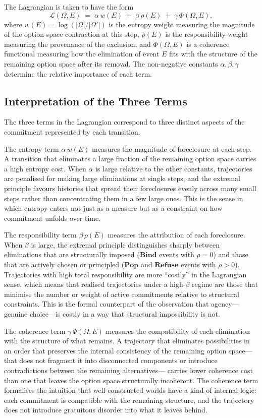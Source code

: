 \documentclass[12pt]{article}
\theoremstyle{plain}
\theoremstyle{definition}
\theoremstyle{remark}
\begin{document}
The Lagrangian is taken to have the form
\[
  \mathcal{L}(\Omega, E)
  \;=\;
  \alpha\, w(E) \;+\; \beta\, \rho(E) \;+\; \gamma\, \Phi(\Omega, E),
\]
where $w(E) = \log(|\Omega| / |\Omega'|)$ is the entropy weight measuring the
magnitude of the option-space contraction at this step, $\rho(E)$ is the
responsibility weight measuring the provenance of the exclusion, and
$\Phi(\Omega, E)$ is a coherence functional measuring how the elimination of
event $E$ fits with the structure of the remaining option space after its
removal.  The non-negative constants $\alpha, \beta, \gamma$ determine the
relative importance of each term.

\subsection{Interpretation of the Three Terms}

The three terms in the Lagrangian correspond to three distinct aspects of the
commitment represented by each transition.

The entropy term $\alpha\, w(E)$ measures the magnitude of foreclosure at each
step.  A transition that eliminates a large fraction of the remaining option
space carries a high entropy cost.  When $\alpha$ is large relative to the other
constants, trajectories are penalised for making large eliminations at single
steps, and the extremal principle favours histories that spread their foreclosures
evenly across many small steps rather than concentrating them in a few large ones.
This is the sense in which entropy enters not just as a measure but as a
constraint on how commitment unfolds over time.

The responsibility term $\beta\, \rho(E)$ measures the attribution of each
foreclosure.  When $\beta$ is large, the extremal principle distinguishes
sharply between eliminations that are structurally imposed ($\mathbf{Bind}$
events with $\rho = 0$) and those that are actively chosen or principled
($\mathbf{Pop}$ and $\mathbf{Refuse}$ events with $\rho > 0$).  Trajectories
with high total responsibility are more ``costly'' in the Lagrangian sense,
which means that realised trajectories under a high-$\beta$ regime are those
that minimise the number or weight of active commitments relative to structural
constraints.  This is the formal counterpart of the observation that agency---
genuine choice---is costly in a way that structural impossibility is not.

The coherence term $\gamma\, \Phi(\Omega, E)$ measures the compatibility of
each elimination with the structure of what remains.  A trajectory that
eliminates possibilities in an order that preserves the internal consistency
of the remaining option space---that does not fragment it into disconnected
components or introduce contradictions between the remaining alternatives---
carries lower coherence cost than one that leaves the option space structurally
incoherent.  The coherence term formalises the intuition that well-constructed
worlds have a kind of internal logic: each commitment is compatible with the
remaining structure, and the trajectory does not introduce gratuitous disorder
into what it leaves behind.
\end{document}
